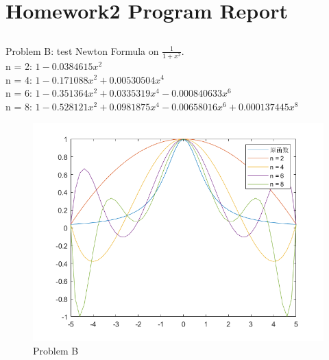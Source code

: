 \documentclass[12pt,letterpaper]{article}
\begin{document}
\section*{Homework2 Program Report}


  \subsection*{} 
    Problem B: test Newton Formula on $\frac{1}{1+x^2}$.\\
    n = 2: $1-0.0384615x^{2}$\\
    n = 4: $1-0.171088x^{2}+0.00530504x^{4}$\\
    n = 6: $1-0.351364x^{2}+0.0335319x^{4}-0.000840633x^{6}$\\
    n = 8: $1-0.528121x^{2}+0.0981875x^{4}-0.00658016x^{6}+0.000137445x^{8}$\\
    \begin{figure}[h]
      \centering
      \includegraphics[width=0.5\linewidth]{pic/B.png}
      \caption{Problem B}
    \end{figure}
\end{document}
